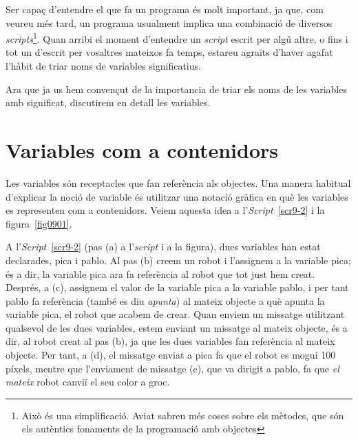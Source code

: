 Ser capaç d'entendre el que fa un programa és molt important, ja que, com veureu més tard, un programa usualment implica una combinació de diversos \emph{scripts}\footnote{Això és una simplificació. Aviat sabreu més coses sobre els mètodes, que són els autèntics fonaments de la programació amb objectes}. Quan arribi el moment d'entendre un \emph{script} escrit per algú altre, o fins i tot un d'escrit per vosaltres mateixos fa temps, estareu agraïts d'haver agafat l'hàbit de triar noms de variables significatius.

Ara que ja us hem convençut de la importancia de triar els noms de les variables amb significat, discutirem en detall les variables.

\section{Variables com a contenidors}
Les variables són receptacles que fan referència als objectes. Una manera habitual d'explicar la noció de variable és utilitzar una notació gràfica en què les variables es representen com a contenidors. Veiem aquesta idea a l'\emph{Script}~\ref{scr9-2} i la figura~\ref{fig0901}.

A l'\emph{Script}~\ref{scr9-2} (pas (a) a l'\emph{script} i a la figura), dues variables han estat declarades, \textsf{pica} i \textsf{pablo}. Al pas (b) creem un robot i l'assignem a la variable \textsf{pica}; és a dir, la variable \textsf{pica} ara fa referència al robot que tot just hem creat. Després, a (c), assignem el valor de la variable \textsf{pica} a la variable \textsf{pablo}, i per tant \textsf{pablo} fa referència (també es diu \emph{apunta}) al mateix objecte a què apunta la variable \textsf{pica}, el robot que acabem de crear. Quan enviem un missatge utilitzant qualsevol de les dues variables, estem enviant un missatge al mateix objecte, és a dir, al robot creat al pas (b), ja que les dues variables fan referència al mateix objecte. Per tant, a (d), el missatge enviat a \textsf{pica} fa que el robot es mogui 100 píxels, mentre que l'enviament de missatge (e), que va dirigit a \textsf{pablo}, fa que \emph{el mateix} robot canviï el seu color a groc.

